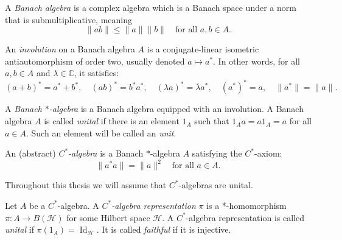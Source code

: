 \begin{definition}
    \label{def:c-star-algebra}
    A \emph{Banach algebra} is a complex algebra which is a Banach
    space under a norm that is submultiplicative, meaning
    \[
        \|ab\| \leq \|a\| \|b\| \quad \text{for all } a, b \in A.
    \]

    An \emph{involution} on a Banach algebra \( A \) is a
    conjugate-linear isometric antiautomorphism of order two, usually
    denoted \( a \mapsto a^* \). In other words, for all \( a, b \in
    A \) and \( \lambda \in \mathbb{C} \), it satisfies:
    \[
        (a + b)^* = a^* + b^*, \quad (ab)^* = b^* a^*, \quad (\lambda
        a)^* = \bar{\lambda} a^*, \quad (a^*)^* = a, \quad \|a^*\| = \|a\|.
    \]

    A \emph{Banach \( * \)-algebra} is a Banach algebra equipped with
    an involution. A Banach algebra \( A \) is called \emph{unital} if there
    is an element \( 1_A \) such that \( 1_A a = a 1_A = a \) for all
    \( a \in A \). Such an element will be called an \emph{unit}.

    An (abstract) \emph{\( C^* \)-algebra} is a Banach \( *
    \)-algebra \( A \) satisfying the \( C^* \)-axiom:
    \[
        \|a^* a\| = \|a\|^2 \quad \text{for all } a \in A.
    \]
\end{definition}

\begin{remark}
    Throughout this thesis we will assume that \(C^{*}\)-algebras are unital.
\end{remark}

\begin{definition}
    Let \( A \) be a \(C^{*}\)-algebra. A \emph{\(C^{*}\)-algebra
    representation} \( \pi \)
    is a *-homomorphism \(\pi: A \rightarrow B(\mathcal{H}) \) for some
    Hilbert space
    \( \mathcal{H} \).
    A \(C^{*}\)-algebra representation is called \emph{unital} if
    \( \pi(1_A) = \operatorname{Id}_{\mathcal{H}} \). It is called
    \emph{faithful} if it is injective.
\end{definition}

